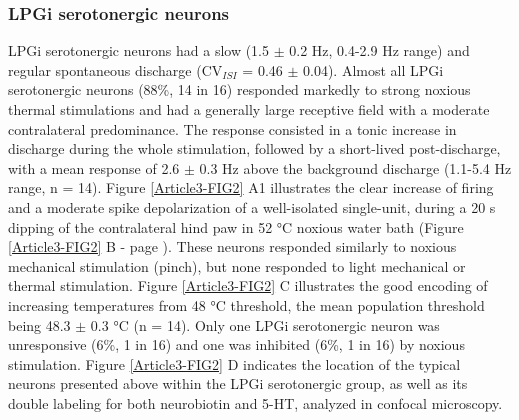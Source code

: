 \documentclass[a4paper,12pt,twoside]{report}
\begin{document}
\begin{figure}[p]
\label{Article3-FIG1}

\end{figure}

\subsubsection{LPGi serotonergic neurons}

LPGi serotonergic neurons had a slow (1.5 $\pm$ 0.2 Hz, 0.4-2.9 Hz range) and regular spontaneous discharge (CV$_{ISI}$ = 0.46 $\pm$ 0.04). Almost all LPGi serotonergic neurons (88\%, 14 in 16) responded markedly to strong noxious thermal stimulations and had a generally large receptive field with a moderate contralateral predominance. The response consisted in a tonic increase in discharge during the whole stimulation, followed by a short-lived post-discharge, with a mean response of 2.6 $\pm$ 0.3 Hz above the background discharge (1.1-5.4 Hz range, n = 14). Figure \ref{Article3-FIG2} A1 illustrates the clear increase of firing and a moderate spike depolarization of a well-isolated single-unit, during a 20 s dipping of the contralateral hind paw in 52 °C noxious water bath (Figure \ref{Article3-FIG2} B - page \pageref{Article3-FIG2}). These neurons responded similarly to noxious mechanical stimulation (pinch), but none responded to light mechanical or thermal stimulation. Figure \ref{Article3-FIG2} C illustrates the good encoding of increasing temperatures from 48 °C threshold, the mean population threshold being 48.3 $\pm$ 0.3 °C (n = 14). Only one LPGi serotonergic neuron was unresponsive (6\%, 1 in 16) and one was inhibited (6\%, 1 in 16) by noxious stimulation. Figure \ref{Article3-FIG2} D indicates the location of the typical neurons presented above within the LPGi serotonergic group, as well as its double labeling for both neurobiotin and 5-HT, analyzed in confocal microscopy.
\end{document}
